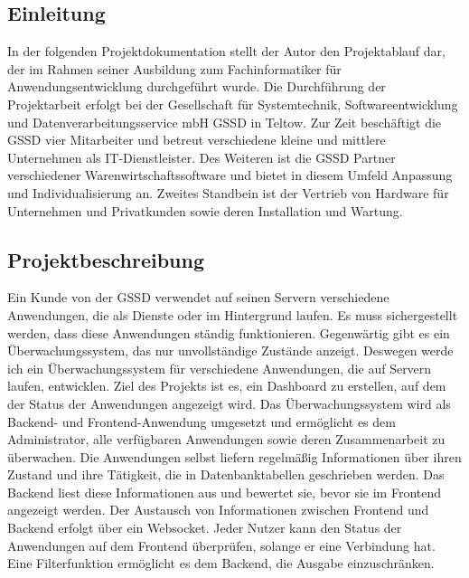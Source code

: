 \begin{flushleft}
\setcounter{page}{1}
\section{Einleitung}
In der folgenden Projektdokumentation stellt der Autor den Projektablauf dar, der im Rahmen seiner
Ausbildung zum Fachinformatiker für Anwendungsentwicklung durchgeführt wurde. Die Durchführung der
Projektarbeit erfolgt bei der Gesellschaft für Systemtechnik, Softwareentwicklung und
Datenverarbeitungsservice mbH \acs{GSSD} in Teltow. Zur Zeit beschäftigt die \acs{GSSD} vier Mitarbeiter und
betreut verschiedene kleine und mittlere Unternehmen als IT-Dienstleister. Des Weiteren ist die \acs{GSSD}
Partner verschiedener Warenwirtschaftssoftware und bietet in diesem Umfeld Anpassung und
Individualisierung an. Zweites Standbein ist der Vertrieb von Hardware für Unternehmen und Privatkunden
sowie deren Installation und Wartung.



\subsection{Projektbeschreibung}
Ein Kunde von der \acs{GSSD} verwendet auf seinen Servern verschiedene Anwendungen, die als
Dienste oder im Hintergrund laufen. Es muss sichergestellt werden, dass diese Anwendungen
ständig funktionieren. Gegenwärtig gibt es ein Überwachungssystem, das nur unvollständige
Zustände anzeigt. Deswegen werde ich ein Überwachungssystem für verschiedene Anwendungen, die auf Servern laufen, entwicklen.
Ziel des Projekts ist es, ein Dashboard zu erstellen, auf dem der Status der Anwendungen angezeigt wird.
Das Überwachungssystem wird als Backend- und Frontend-Anwendung umgesetzt und ermöglicht es dem Administrator, alle verfügbaren Anwendungen sowie deren Zusammenarbeit zu überwachen.
Die Anwendungen selbst liefern regelmäßig Informationen über ihren Zustand und ihre Tätigkeit, die in Datenbanktabellen geschrieben werden.
Das Backend liest diese Informationen aus und bewertet sie, bevor sie im Frontend angezeigt werden.
Der Austausch von Informationen zwischen Frontend und Backend erfolgt über ein Websocket.
Jeder Nutzer kann den Status der Anwendungen auf dem Frontend überprüfen, solange er eine Verbindung hat.
Eine Filterfunktion ermöglicht es dem Backend, die Ausgabe einzuschränken.




\end{flushleft}
